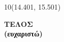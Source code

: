 \documentclass{article}
\begin{document}

\newpage

\begin{textblock}{10}(14.401, 15.501)
    \boxed{\textbf{\LaTeX{}}}
\end{textblock}

\begin{center}
    \vspace*{\fill}
    \textbf{\LARGE{ΤΕΛΟΣ}} \\[0.001cm]
    \textbf{\hspace{0.1cm}(ευχαριστώ)}
    \\[0.1cm]
    \vspace*{\fill}
\end{center}

\end{document}
